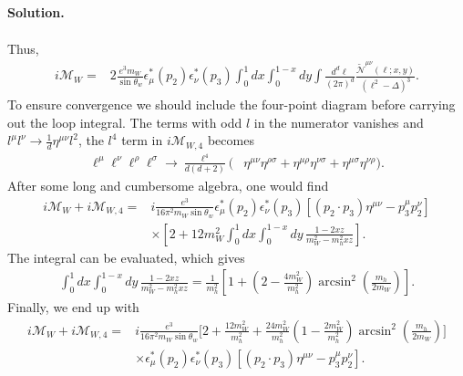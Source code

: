 \documentclass[a4paper,11pt]{article}
\newenvironment{solution}{\par\medskip\noindent\textbf{Solution.}\par\smallskip}{\par\medskip}
\begin{document}
\begin{solution}
\begin{equation}
\begin{aligned}
\end{aligned}
\end{equation}
Thus,
\begin{equation}
\begin{aligned}
i\mathcal M_{W}
={}&
2\frac{e^3m_W}{\sin\theta_w}
\epsilon_\mu^*(p_2)\epsilon_\nu^*(p_3)
\int_0^1dx\int_0^{1-x}dy
\int\frac{d^d\ell}{(2\pi)^d}
\frac{
\widetilde{\mathcal N}^{\mu\nu}(\ell;x,y)
}{
(\ell^2-\Delta)^3
}.
\end{aligned}
\end{equation}
To ensure convergence we should include the four-point diagram before carrying out the loop integral.
The terms with odd $l$ in the numerator vanishes and $l^\mu l^\nu \to \frac{1}{d}\eta^{\mu\nu}l^2$, the $l^4$ term in $i\mathcal{M}_{W,4}$ becomes
\begin{equation}
\begin{aligned}
\ell^\mu\ell^\nu\ell^\rho\ell^\sigma
\longrightarrow
\frac{\ell^4}{d(d+2)}
\Big(
&\eta^{\mu\nu}\eta^{\rho\sigma}
+\eta^{\mu\rho}\eta^{\nu\sigma}
+\eta^{\mu\sigma}\eta^{\nu\rho}
\Big).
\end{aligned}
\end{equation}
After some long and cumbersome algebra, one would find
\begin{equation}
\begin{aligned}
i\mathcal M_W+i\mathcal M_{W,4}
={}&
i\frac{e^3}
{16\pi^2m_W\sin\theta_w}
\epsilon_\mu^*(p_2)\epsilon_\nu^*(p_3)
\left[
(p_2\cdot p_3)\eta^{\mu\nu}
-p_3^\mu p_2^\nu
\right]
\\
&\times
\left[
2+
12m_W^2
\int_0^1dx\int_0^{1-x}dy\,
\frac{1-2xz}{m_W^2-m_h^2xz}
\right].
\end{aligned}
\end{equation}
The integral can be evaluated, which gives
\begin{equation}
\begin{aligned}
\int_0^1dx\int_0^{1-x}dy\,
\frac{1-2xz}{m_W^2-m_h^2xz}
=
\frac{1}{m_h^2}
\left[
1+\left(2-\frac{4m_W^2}{m_h^2}\right)\arcsin^2\left(\frac{m_h}{2m_W}\right)
\right].
\end{aligned}
\end{equation}
Finally, we end up with
\begin{equation}
\begin{aligned}
i\mathcal M_W + i\mathcal M_{W,4}
={}&
i\frac{e^3}
{16\pi^2m_W\sin\theta_w}
\Bigg[
2+\frac{12m_W^2}{m_h^2}
+\frac{24m_W^2}{m_h^2}
\left(
1-\frac{2m_W^2}{m_h^2}
\right)
\arcsin^2\left(\frac{m_h}{2m_W}\right)
\Bigg]
\\
&\times
\epsilon_\mu^*(p_2)\epsilon_\nu^*(p_3)
\left[
(p_2\cdot p_3)\eta^{\mu\nu}
-p_3^\mu p_2^\nu
\right].
\end{aligned}
\end{equation}


\end{solution}
\end{document}
